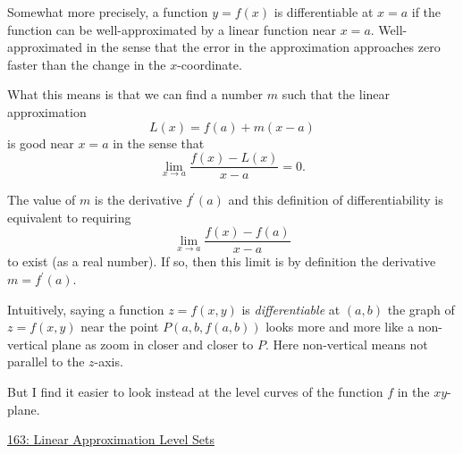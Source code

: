 \documentclass{ximera}
\begin{document}
Somewhat more precisely, a function $y=f(x)$ is differentiable at $x=a$ if the function can be well-approximated by a linear function near $x=a$. Well-approximated in the sense that the error in the approximation approaches zero faster than the change in the $x$-coordinate.

What this means is that we can find a number $m$ such that the linear approximation
\[
   L(x) = f(a) + m(x-a)
\]
is good near $x=a$ in the sense that
\[
   \lim_{x\to a} \frac{f(x) - L(x)}{x-a} = 0.
\]

The value of $m$ is the derivative $f^\prime(a)$ and this definition of differentiability is equivalent to requiring
\[
 \lim_{x\to a} \frac{f(x) - f(a)}{x-a} 
\]
to exist (as a real number). If so, then this limit is by definition the derivative $m=f^\prime(a)$. 

Intuitively, saying a function $z=f(x,y)$ is \emph{differentiable} at $(a,b)$ the graph of $z=f(x,y)$ near the point $P(a,b,f(a,b))$ looks more and more like a non-vertical plane as zoom in closer and closer to $P$. Here non-vertical means not parallel to the $z$-axis.

But I find it easier to look instead at the level curves of the function $f$ in the $xy$-plane.

\begin{onlineOnly}
    \begin{center}
\end{center}
\end{onlineOnly}

\href{https://www.desmos.com/calculator/lyquf7jmbb}{163: Linear Approximation Level Sets}
\end{document}
